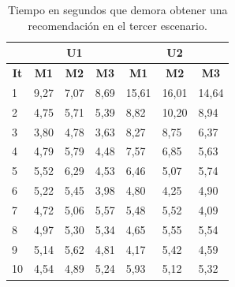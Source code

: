 \begin{table}[H]
  \begin{center}
    \caption{Tiempo en segundos que demora obtener una recomendación en el tercer escenario.}
    \label{tab:res-tab03}
    \begin{tabular}{|l|l|l|l|l|l|l|}
      \hline
       & \multicolumn{3}{c|}{\textbf{U1}} & \multicolumn{3}{c|}{\textbf{U2}} \\ \hline
      \multicolumn{1}{|c|}{\textbf{It}} & \multicolumn{1}{c|}{\textbf{M1}} & \multicolumn{1}{c|}{\textbf{M2}} & \multicolumn{1}{c|}{\textbf{M3}} & \multicolumn{1}{c|}{\textbf{M1}} & \multicolumn{1}{c|}{\textbf{M2}} & \multicolumn{1}{c|}{\textbf{M3}} \\ \hline
      1 & 9,27 & 7,07 & 8,69 & 15,61 & 16,01 & 14,64 \\ \hline
      2 & 4,75 & 5,71 & 5,39 & 8,82 & 10,20 & 8,94 \\ \hline
      3 & 3,80 & 4,78 & 3,63 & 8,27 & 8,75 & 6,37 \\ \hline
      4 & 4,79 & 5,79 & 4,48 & 7,57 & 6,85 & 5,63 \\ \hline
      5 & 5,52 & 6,29 & 4,53 & 6,46 & 5,07 & 5,74 \\ \hline
      6 & 5,22 & 5,45 & 3,98 & 4,80 & 4,25 & 4,90 \\ \hline
      7 & 4,72 & 5,06 & 5,57 & 5,48 & 5,52 & 4,09 \\ \hline
      8 & 4,97 & 5,30 & 5,34 & 4,65 & 5,55 & 5,54 \\ \hline
      9 & 5,14 & 5,62 & 4,81 & 4,17 & 5,42 & 4,59 \\ \hline
      10 & 4,54 & 4,89 & 5,24 & 5,93 & 5,12 & 5,32 \\ \hline
    \end{tabular}
  \end{center}
\end{table}


